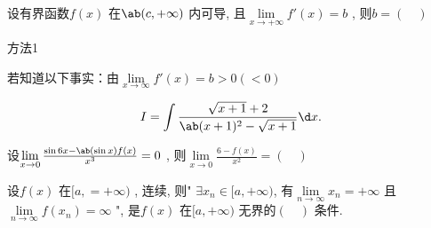 \begin{question}
    设有界函数$ f(x) $ 在$ \ab(c, +\infty) $ 内可导, 且$ \lim\limits_{x \to +\infty} f\prime(x) = b $ , 则$ b = (\quad) $ 
\end{question}

\begin{solution}
    [分析] 方法1

    若知道以下事实：由$ \lim\limits_{x \to \infty} f\prime(x) = b > 0 ( < 0 )  $ 
\end{solution}

\begin{question}
    \begin{equation*}
        I = \int \frac{ \sqrt{x + 1} + 2 }{\ab(x + 1)^2 - \sqrt{x + 1}} \d x.
    \end{equation*}
\end{question}

\begin{question}
    设$ \lim\limits_{x \to 0} \frac{ \sin 6x - \ab(\sin x) f(x) }{ x^3 } = 0 $ , 则$ \lim\limits_{x \to 0} \frac{6 - f(x)}{x^2} = (\quad) $ 
\end{question}

\begin{question}
    设$ f(x) $ 在$ [a, = +\infty) $ , 连续, 则" $ \exists x_n \in [a, +\infty) $, 有$ \lim\limits_{n \to \infty} x_n = +\infty $ 且$ \lim\limits_{n \to \infty} f(x_n) = \infty $ ", 是$ f(x) $ 在$ [a, +\infty) $ 无界的$ (\quad) $ 条件.
\end{question}